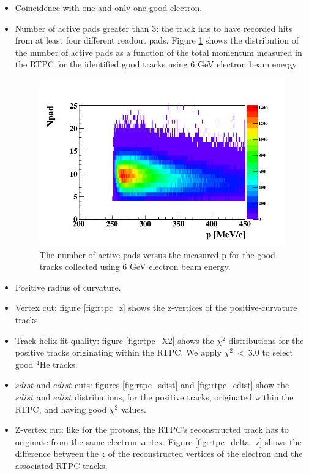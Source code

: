 \begin{itemize}
\item Coincidence with one and only one good electron.  
\item Number of active pads greater than 3: the track has to have recorded hits 
   from at least four different readout pads. Figure \ref{fig:padnb} shows the 
   distribution of the number of active pads as a function of the total 
   momentum measured in the RTPC for the identified good tracks using 6 GeV 
   electron beam energy.
   
   \begin{figure}[tbp]
      \centering
      \includegraphics[height=7.2cm]{fig_analysis/npd_p.png}
      \caption{The number of active pads versus the measured p for the good 
      tracks collected using 6 GeV electron beam energy.}
      \label{fig:padnb}
   \end{figure}

\item Positive radius of curvature. 

\item Vertex cut: figure \ref{fig:rtpc_z} shows the z-vertices of the 
   positive-curvature tracks.

\item Track helix-fit quality: figure \ref{fig:rtpc_X2} shows the $\chi^{2}$ 
   distributions for the positive tracks originating within the RTPC. We apply 
   $\chi^{2}$~<~3.0 to select good $^4$He tracks.

\item $sdist$ and $edist$ cuts: figures \ref{fig:rtpc_sdist} and \ref{fig:rtpc_edist} show the $sdist$ and $edist$ distributions, for the positive tracks, originated within the RTPC, and having good $\chi^{2}$ values.

\item Z-vertex cut: like for the protons, the RTPC's reconstructed track has to originate from the same electron vertex. Figure \ref{fig:rtpc_delta_z} shows the difference between the $z$ of the reconstructed vertices of the electron and the associated RTPC tracks. 


\end{itemize}

